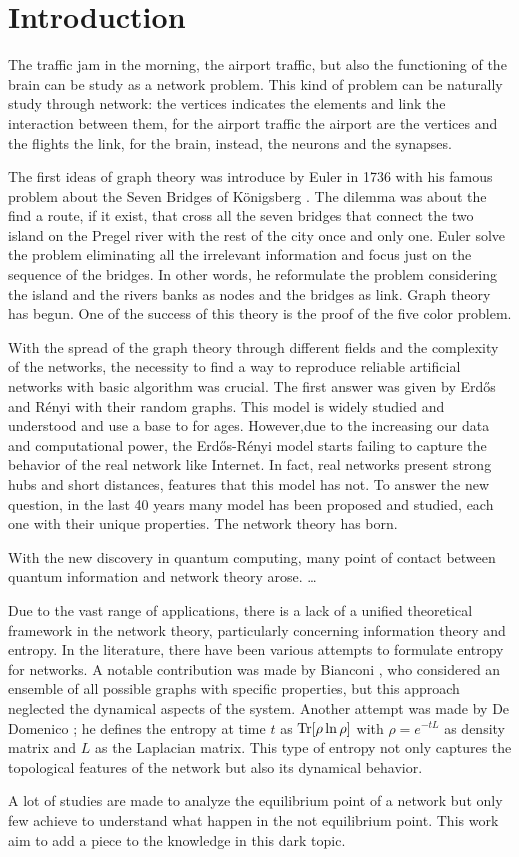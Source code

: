 \chapter*{Introduction}

The traffic jam in the morning, the airport traffic, but also the functioning of the brain can be study as a network problem. 
This kind of problem can be naturally study through network: the vertices indicates the elements and link the interaction between them, for the airport traffic the airport are the vertices and the flights the link, for the brain, instead, the neurons and the synapses. 



The first ideas of graph theory was introduce by Euler in 1736 with his famous problem about the Seven Bridges of Königsberg \cite{Euler}. The dilemma was about the find a route, if it exist, that cross all the seven bridges that connect the two island on the Pregel river with the rest of the city once and only one.  Euler solve the problem eliminating all the irrelevant information and focus just on the sequence of the bridges. In other words, he reformulate the problem considering the island and the rivers banks as nodes and the bridges as link.
Graph theory has begun. 
One of the success of this theory is the proof of the five color problem.

With the spread of the graph theory through different fields and the complexity of the networks, the necessity to find a way to reproduce reliable  artificial networks with basic algorithm was crucial. The first answer was given by Erd\H{o}s and Rényi \cite{erdos-renyi1960} with their random graphs. This model is widely studied and understood and use a base to for ages. 
However,due to the increasing our data and computational power, the Erd\H{o}s-Rényi model starts failing to capture the behavior of the real network like Internet. In fact, real networks present strong hubs and short distances, features that this model has not. 
To answer the new question, in the last 40 years many model has been proposed and studied, each one with their unique properties. The network theory has born. 

With the new discovery in quantum computing, many point of contact between quantum information and network theory arose. \dots


Due to the vast range of applications, there is a lack of a unified theoretical framework in the network theory, particularly concerning information theory and entropy. 
In the literature, there have been various attempts to formulate entropy for networks. A notable contribution was made by Bianconi \cite{Bianconi_entropy_1}\cite{Bianconi_entropy_2}, who considered an ensemble of all possible graphs with specific properties, but this approach neglected the dynamical aspects of the system.
Another attempt was made by De Domenico \cite{De_Domenico_2016}; he defines the entropy at time $t$ as $\operatorname{Tr}[\rho \ln \rho]$ with $\rho = e^{-tL}$ as density matrix and $L$ as the Laplacian matrix. This type of entropy not only captures the topological features of the network but also its dynamical behavior.



A lot of studies are made to analyze the equilibrium point of a network but only few achieve to understand what happen in the not equilibrium point. This work aim to add a piece to the knowledge in this dark topic.
